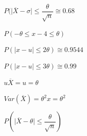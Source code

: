 \documentclass[a4paper,openright,12pt]{book}
\begin{document}
{\begin{center}
	$P(\mid\overline{X}- \sigma \mid \leq \dfrac{\theta}{\sqrt{n}} \cong 0.68$
\end{center}
\begin{center}
	$P(-\theta \leq x-4\leq \theta)$
\end{center}
\begin{center}
	$P(\mid x - u \mid \leq 2\theta) \cong 0.9544$
\end{center}
\begin{center}
	$P(\mid x - u \mid \leq 3\theta) \cong 0.99$
\end{center}
\begin{center}
	$u\overline{X} = u = \theta$
\end{center}
\begin{center}
	$Var(\overline{X}) = \theta^{2}x = \theta^{2}$
\end{center}
\begin{center}
	$  P(\mid \overline{X} - \theta \mid \leq \dfrac{\theta}{\sqrt{n}})$
\end{center}

}
\end{document}
